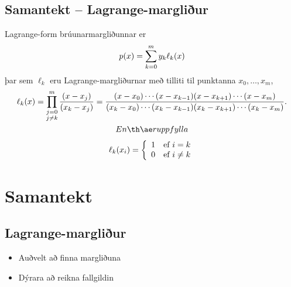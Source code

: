 \documentclass[letterpaper,10pt,icelandic]{sphinxmanual}
\begin{document}
\subsection{Samantekt – Lagrange-margliður}
\label{kafli03:samantekt-lagrange-margliur}
Lagrange-form brúunarmargliðunnar er
\begin{gather}
\begin{split}p(x)=\sum_{k=0}^m y_k\ell_{k}(x)\end{split}\notag
\end{gather}
þar sem \(\ell_{k}\) eru Lagrange-margliðurnar með tilliti til
punktanna \(x_0,\dots,x_m\),
\begin{gather}
\begin{split}  \ell_{k}(x) = \prod_
      {\substack{j=0\\ j\neq k}}^m\dfrac{(x-x_j)}{(x_k-x_j)}
      = \dfrac{(x-x_0)\cdots(x-x_{k-1})
          (x-x_{k+1})\cdots(x-x_m)}
      {(x_k-x_0)\cdots(x_k-x_{k-1})
          (x_k-x_{k+1})\cdots(x_k-x_m)}.\end{split}\notag\\\begin{split}En þær uppfylla\end{split}\notag
\end{gather}\begin{gather}
\begin{split}\ell_{k}(x_i) = \left\{ \begin{array}{cc}
      1 & \text{ef } i = k \\
      0 & \text{ef } i \not= k
  \end{array} \right.\end{split}\notag
\end{gather}

\section{Samantekt}
\label{kafli03:id3}

\subsection{Lagrange-margliður}
\label{kafli03:lagrange-margliur}\begin{itemize}
\item {} 
Auðvelt að finna margliðuna

\item {} 
Dýrara að reikna fallgildin

\end{itemize}
\end{document}

